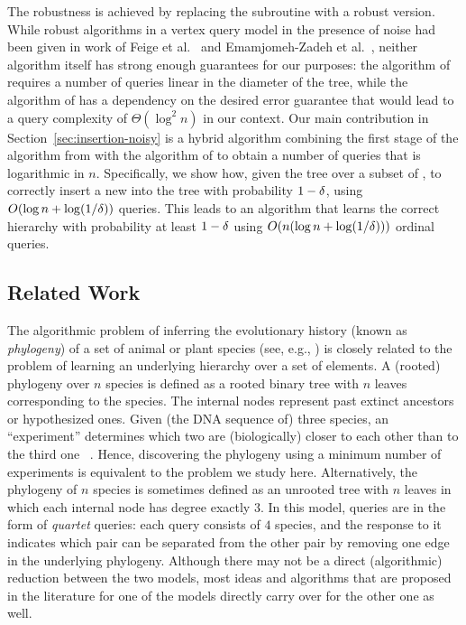 The robustness is achieved by replacing
the \binarysearch subroutine with a robust version.
While robust \binarysearch algorithms
in a vertex query model in the presence of noise
had been given in work of
Feige et al.~\cite{feige-raghavan-peleg-upfal:1994:noisy}
and Emamjomeh-Zadeh et al.~\cite{2016:binary-search},
neither algorithm itself has strong enough guarantees for our purposes:
the algorithm of \cite{feige-raghavan-peleg-upfal:1994:noisy} 
requires a number of queries linear in the diameter of the tree,
while the algorithm of \cite{2016:binary-search} has a dependency on
the desired error guarantee that would lead to a query complexity of
$\Theta(\log ^2 n)$ in our context.
Our main contribution in Section~\ref{sec:insertion-noisy}
is a hybrid algorithm combining the first stage of the algorithm
from \cite{2016:binary-search} with the algorithm of
\cite{feige-raghavan-peleg-upfal:1994:noisy} to obtain a number of
queries that is logarithmic in $n$.
Specifically, we show how, given the tree over a subset of \elements,
to correctly insert a new \element into the tree
with probability $1 - \delta$, using $O(\log n + \log (1/\delta))$ queries.
This leads to an algorithm that learns the correct hierarchy \TreeOpt
with probability at least $1-\delta$ using
$O(n (\log n + \log(1/\delta)))$ ordinal queries.

\subsection*{Related Work}

The algorithmic problem of inferring the evolutionary history
(known as \emph{phylogeny}) of a set of animal or plant species
(see, e.g., \cite{aho-sagiv-szymanski-ullman:1981:inferring-tree,%
kannan-lawler-warnow:1996:phylogeny-triplet,%
erdos-steel-szekely-warnow:1999:phylogeny-quartet-a,%
brodal-fagerberg-pedersen-ostlin:2001:phylogeny-higher-degree,%
felsenstein:2004:phylogenies,%
gronau-moran-snir:2008:phylogeny-short-edges,%
wu-kao-lin-you:2008:pylogeny-noisy,%
truszkowski:2013:thesis})
is closely related to the problem of learning an underlying hierarchy
over a set of elements.
A (rooted) phylogeny over $n$ species is defined as a rooted binary tree
with $n$ leaves corresponding to the species.
The internal nodes represent
past extinct ancestors or hypothesized ones.
Given (the DNA sequence of) three species,
an ``experiment'' determines which two
are (biologically) closer to each other than to the third one~%
\cite{kannan-lawler-warnow:1996:phylogeny-triplet,%
wu-kao-lin-you:2008:pylogeny-noisy}.
Hence, discovering the phylogeny using a minimum number of experiments
is equivalent to the problem we study here.
Alternatively, the phylogeny of $n$ species
is sometimes defined as an unrooted tree with $n$ leaves
in which each internal node has degree exactly $3$.
In this model, queries are in the form of \emph{quartet} queries:
each query consists of $4$ species,
and the response to it indicates which pair can be separated
from the other pair by removing one edge in the underlying phylogeny.
Although there may not be a direct (algorithmic) reduction
between the two models, most ideas and algorithms that are proposed
in the literature for one of the models
directly carry over for the other one as well.

